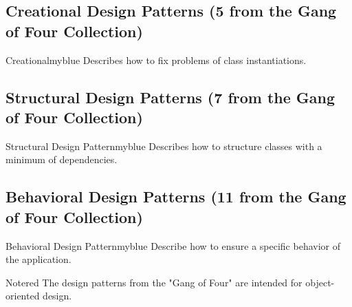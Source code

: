 \vspace{0.75cm}


\subsection{Creational Design Patterns (5 from the Gang of Four Collection)}
\begin{prettyBox}{Creational}{myblue}
Describes how to fix problems of class instantiations.
\end{prettyBox}

\newpage

\subsection{Structural Design Patterns (7 from the Gang of Four Collection)}
\begin{prettyBox}{Structural Design Pattern}{myblue}
Describes how to structure classes with a minimum of dependencies.
\end{prettyBox}

\vspace{0.25cm}

\subsection{Behavioral Design Patterns (11 from the Gang of Four Collection)}
\begin{prettyBox}{Behavioral Design Pattern}{myblue}
Describe how to ensure a specific behavior of the application.
\end{prettyBox}


\vspace{0.25cm}
\begin{prettyBox}{Note}{red}
The design patterns from the "Gang of Four" are intended for
object-oriented design.
\end{prettyBox}

\vspace{0.5cm}

